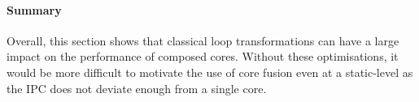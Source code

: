 \paragraph*{Summary}

Overall, this section shows that classical loop transformations can have a large impact on the performance of composed cores.
Without these optimisations, it would be more difficult to motivate the use of core fusion even at a static-level as the IPC does not deviate enough from a single core.
